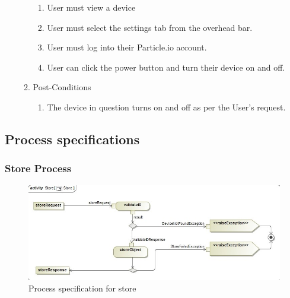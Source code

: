 \documentclass{article}
\begin{document}
\begin{enumerate}
\begin{enumerate}
\begin{enumerate}
					\item	User must view a device
					\item	User must select the settings tab from the overhead bar.
					\item	User must log into their Particle.io account.
					\item	User can click the power button and turn their device on and off.
				\end{enumerate}
				\item  Post-Conditions		
				\begin{enumerate}
					\item	The device in question turns on and off as per the User's request.
				\end{enumerate}
			\end{enumerate}
	\end{enumerate}
	\newpage
	\subsection{Process specifications}
	\subsubsection{Store Process}
	\begin{figure}[H]
		\includegraphics[width=\textwidth]{images/Store.jpg}
		\caption{Process specification for store \label{overflow}}
	\end{figure}
\end{document}
